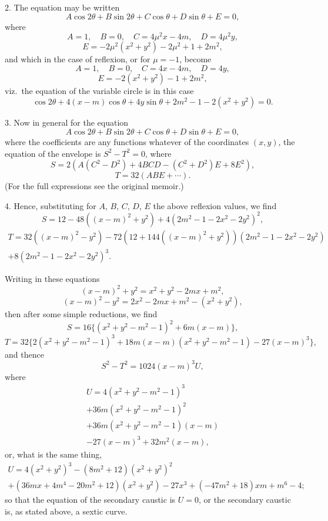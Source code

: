 \documentclass[11pt,a4paper]{article}
\theoremstyle{plain}
\begin{document}
2. The equation may be written
\[
A\cos 2\theta + B\sin 2\theta + C\cos\theta + D\sin\theta + E = 0,
\]
where
\[
A = 1, \quad B = 0, \quad C = 4\mu^2x - 4m, \quad D = 4\mu^2y,
\]
\[
E = -2\mu^2(x^2 + y^2) - 2\mu^2 + 1 + 2m^2,
\]
and which in the case of reflexion, or for $\mu = -1$, become
\[
A = 1, \quad B = 0, \quad C = 4x - 4m, \quad D = 4y,
\]
\[
E = -2(x^2 + y^2) - 1 + 2m^2,
\]
viz.\ the equation of the variable circle is in this case
\[
\cos 2\theta + 4(x-m)\cos\theta + 4y\sin\theta + 2m^2 - 1 - 2(x^2 + y^2) = 0.
\]

3. Now in general for the equation
\[
A\cos 2\theta + B\sin 2\theta + C\cos\theta + D\sin\theta + E = 0,
\]
where the coefficients are any functions whatever of the coordinates $(x, y)$, the equation of the envelope is $S^2 - T^2 = 0$, where
\[
S = 2(A(C^2 - D^2) + 4BCD - (C^2 + D^2)E + 8E^2),
\]
\[
T = 32(ABE + \cdots).
\]
(For the full expressions see the original memoir.)

4. Hence, substituting for $A$, $B$, $C$, $D$, $E$ the above reflexion values, we find
\[
S = 12 - 48((x-m)^2 + y^2) + 4(2m^2 - 1 - 2x^2 - 2y^2)^2,
\]
\begin{multline*}
T = 32((x-m)^2 - y^2) - 72(12 + 144((x-m)^2 + y^2))(2m^2 - 1 - 2x^2 - 2y^2) \\
+ 8(2m^2 - 1 - 2x^2 - 2y^2)^3.
\end{multline*}

Writing in these equations
\[
(x-m)^2 + y^2 = x^2 + y^2 - 2mx + m^2,
\]
\[
(x-m)^2 - y^2 = 2x^2 - 2mx + m^2 - (x^2 + y^2),
\]
then after some simple reductions, we find
\[
S = 16\{(x^2 + y^2 - m^2 - 1)^2 + 6m(x-m)\},
\]
\[
T = 32\{2(x^2 + y^2 - m^2 - 1)^3 + 18m(x-m)(x^2 + y^2 - m^2 - 1) - 27(x-m)^3\},
\]
and thence
\[
S^2 - T^2 = 1024(x-m)^3 U,
\]
where
\begin{multline*}
U = 4(x^2 + y^2 - m^2 - 1)^3 \\
+ 36m(x^2 + y^2 - m^2 - 1)^2 \\
+ 36m(x^2 + y^2 - m^2 - 1)(x-m) \\
- 27(x-m)^3 + 32m^2(x-m),
\end{multline*}
or, what is the same thing,
\begin{multline*}
U = 4(x^2 + y^2)^3 - (8m^2 + 12)(x^2 + y^2)^2 \\
+ (36mx + 4m^4 - 20m^2 + 12)(x^2 + y^2) - 27x^3 + (-47m^2 + 18)xm + m^6 - 4;
\end{multline*}
so that the equation of the secondary caustic is $U = 0$, or the secondary caustic is, as stated above, a sextic curve.
\end{document}
